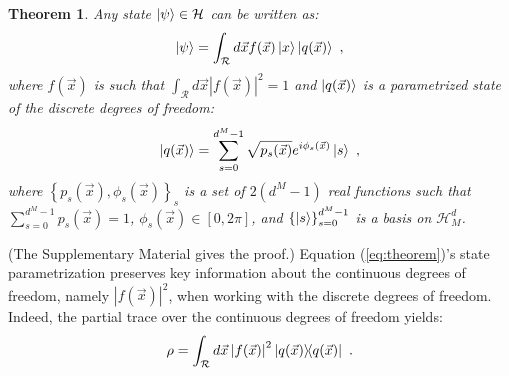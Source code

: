 \documentclass[nofootinbib,pre,twocolumn,showpacs,showkeys,groupaddress,preprintnumbers,floatfix]{revtex4-1}
\newtheorem{theorem}{Theorem}
\newcommand{\1}{\mathbbm{1}}
\begin{document}
\begin{theorem}
\label{MainTheo}
Any state $\ket{\psi} \in \mathcal{H}$ can be written as:
\begin{align}
\ket{\psi} = \int_{\mathcal{R}}d\vec{x} f(\vec{x}) \ket{x}\ket{q(\vec{x})} \label{eq:theorem}
  ~,
\end{align}
where $f(\vec{x})$ is such that $\int_{\mathcal{R}}d\vec{x} |f(\vec{x})|^2 = 1$
and $\ket{q(\vec{x})}$ is a parametrized state of the discrete degrees of
freedom:
\begin{align*}
\ket{q(\vec{x})}
  = \sum_{s=0}^{d^M-1} \sqrt{p_s(\vec{x})} e^{i\phi_s(\vec{x})} \ket{s}
  ~,
\end{align*}
where $\left\{ p_s(\vec{x}),\phi_s(\vec{x})\right\}_s$ is a set of $2(d^M-1)$
real functions such that $\sum_{s=0}^{d^M-1} p_s(\vec{x}) = 1$,
$\phi_s(\vec{x}) \in [0,2\pi]$, and $\left\{\ket{s}\right\}_{s=0}^{d^M-1}$ is a
basis on $\mathcal{H}_M^d$.
\end{theorem}

(The Supplementary Material gives the proof.)
Equation (\ref{eq:theorem})'s state parametrization preserves key information
about the continuous degrees of freedom, namely $|f(\vec{x})|^2$, when working
with the discrete degrees of freedom. Indeed, the partial trace over the
continuous degrees of freedom yields:
\begin{align*}
\rho = \int_{\mathcal{R}} d\vec{x}
  \left\vert f(\vec{x})\right\vert^2 \ket{q(\vec{x})}\!\!\bra{q(\vec{x})}
  ~.
\end{align*}
\end{document}
